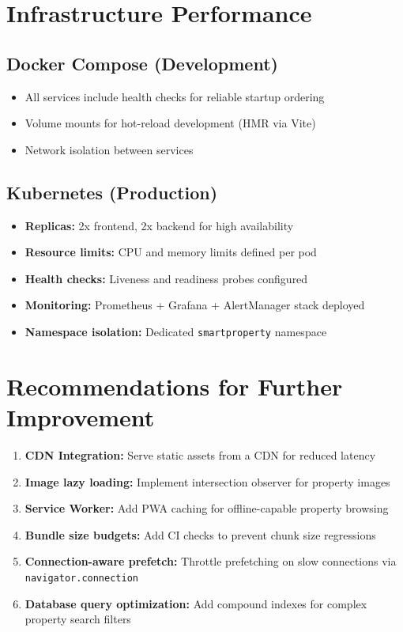 \documentclass[12pt,a4paper]{article}
\begin{document}
\section{Infrastructure Performance}

\subsection{Docker Compose (Development)}

\begin{itemize}[noitemsep]
    \item All services include health checks for reliable startup ordering
    \item Volume mounts for hot-reload development (HMR via Vite)
    \item Network isolation between services
\end{itemize}

\subsection{Kubernetes (Production)}

\begin{itemize}[noitemsep]
    \item \textbf{Replicas:} 2x frontend, 2x backend for high availability
    \item \textbf{Resource limits:} CPU and memory limits defined per pod
    \item \textbf{Health checks:} Liveness and readiness probes configured
    \item \textbf{Monitoring:} Prometheus + Grafana + AlertManager stack deployed
    \item \textbf{Namespace isolation:} Dedicated \texttt{smartproperty} namespace
\end{itemize}

\section{Recommendations for Further Improvement}

\begin{enumerate}[noitemsep]
    \item \textbf{CDN Integration:} Serve static assets from a CDN for reduced latency
    \item \textbf{Image lazy loading:} Implement intersection observer for property images
    \item \textbf{Service Worker:} Add PWA caching for offline-capable property browsing
    \item \textbf{Bundle size budgets:} Add CI checks to prevent chunk size regressions
    \item \textbf{Connection-aware prefetch:} Throttle prefetching on slow connections via \texttt{navigator.connection}
    \item \textbf{Database query optimization:} Add compound indexes for complex property search filters
\end{enumerate}
\end{document}
